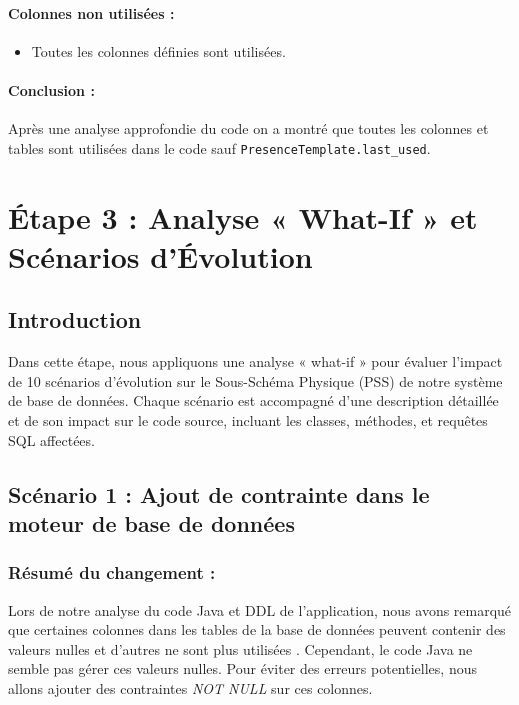 \documentclass[a4paper,11pt]{article}
\begin{document}
\paragraph{Colonnes non utilisées :}
\begin{itemize}
    \item Toutes les colonnes définies sont utilisées.
\end{itemize}

\paragraph{Conclusion :}

Après une analyse approfondie du code on a montré que toutes les colonnes et tables sont utilisées dans le code sauf \texttt{PresenceTemplate.last\_used}.


\section*{Étape 3 : Analyse « What-If » et Scénarios d'Évolution}

\subsection*{Introduction}
Dans cette étape, nous appliquons une analyse « what-if » pour évaluer l'impact de 10 scénarios d'évolution sur le Sous-Schéma Physique (PSS) de notre système de base de données. Chaque scénario est accompagné d'une description détaillée et de son impact sur le code source, incluant les classes, méthodes, et requêtes SQL affectées.

\subsection*{Scénario 1 : Ajout de contrainte dans le moteur de base de données}

\subsubsection*{Résumé du changement :}

Lors de notre analyse du code Java et DDL de l'application, nous avons remarqué que certaines colonnes dans les tables de la base de données peuvent contenir des valeurs nulles et d'autres ne sont plus utilisées . Cependant, le code Java ne semble pas gérer ces valeurs nulles. Pour éviter des erreurs potentielles, nous allons ajouter des contraintes \textit{NOT NULL} sur ces colonnes.
\end{document}
